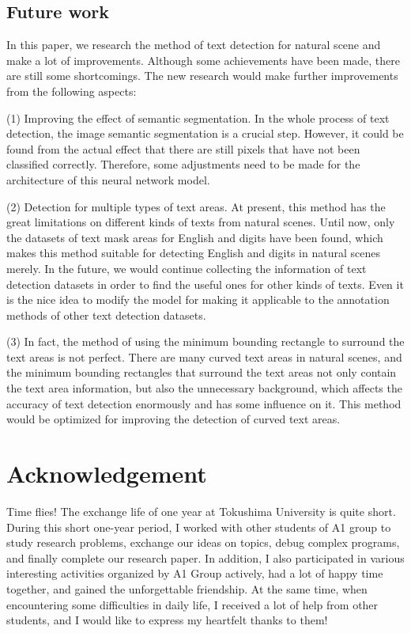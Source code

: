 \documentclass[22pt, UTF8]{article}
\numberwithin{figure}{section}
\numberwithin{table}{section}
\numberwithin{equation}{section} %
\begin{document}
\subsection{Future work}

\setlength\parindent{2em} In this paper, we research the method of text detection for natural scene and make a lot of improvements. Although some achievements have been made, there are still some shortcomings. The new research would make further improvements from the following aspects:

\setlength\parindent{2em} (1) Improving the effect of semantic segmentation. In the whole process of text detection, the image semantic segmentation is a crucial step. However, it could be found from the actual effect that there are still pixels that have not been classified correctly. Therefore, some adjustments need to be made for the architecture of this neural network model.

\setlength\parindent{2em} (2) Detection for multiple types of text areas. At present, this method has the great limitations on different kinds of texts from natural scenes. Until now, only the datasets of text mask areas for English and digits have been found, which makes this method suitable for detecting English and digits in natural scenes merely. In the future, we would continue collecting the information of text detection datasets in order to find the useful ones for other kinds of texts. Even it is the nice idea to modify the model for making it applicable to the annotation methods of other text detection datasets.

\setlength\parindent{2em} (3) In fact, the method of using the minimum bounding rectangle to surround the text areas is not perfect. There are many curved text areas in natural scenes, and the minimum bounding rectangles that surround the text areas not only contain the text area information, but also the unnecessary background, which affects the accuracy of text detection enormously and has some influence on it. This method would be optimized for improving the detection of curved text areas.

\newpage

\section*{Acknowledgement} %

\setlength\parindent{2em} Time flies! The exchange life of one year at Tokushima University is quite short. During this short one-year period, I worked with other students of A1 group to study research problems, exchange our ideas on topics, debug complex programs, and finally complete our research paper. In addition, I also participated in various interesting activities organized by A1 Group actively, had a lot of happy time together, and gained the unforgettable friendship. At the same time, when encountering some difficulties in daily life, I received a lot of help from other students, and I would like to express my heartfelt thanks to them!
\end{document}

